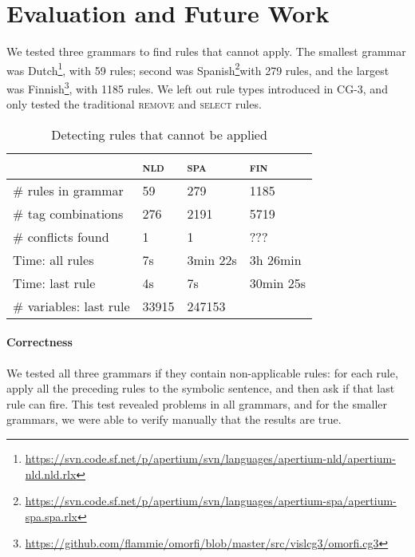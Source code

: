 \section{Evaluation and Future Work}
\label{sec:eval}

We tested three grammars to find rules that cannot apply. The smallest grammar was Dutch\footnote{\url{https://svn.code.sf.net/p/apertium/svn/languages/apertium-nld/apertium-nld.nld.rlx}}, with 59 rules; second was Spanish\footnote{\url{https://svn.code.sf.net/p/apertium/svn/languages/apertium-spa/apertium-spa.spa.rlx}}with 279 rules, and the largest was Finnish\footnote{\url{https://github.com/flammie/omorfi/blob/master/src/vislcg3/omorfi.cg3}}, with 1185 rules. We left out rule types introduced in CG-3, and only tested the traditional \textsc{remove} and \textsc{select} rules.

\begin{table}[]
\centering
\begin{tabular}{|l|l|l|l|}
\hline
                      & \textsc{nld}  & \textsc{spa}  & \textsc{fin}  \\ \hline
\# rules in grammar      & 59              & 279      & 1185     \\ \hline
\# tag combinations      & 276             & 2191     & 5719    \\ \hline
\# conflicts found       & 1               & 1        & ???    \\ \hline
Time: all rules       & 7s              & 3min 22s    & 3h 26min    \\ \hline
Time: last rule       & 4s              & 7s          & 30min 25s    \\ \hline

\# variables: last rule & 33915         & 247153            &    \\ \hline

\end{tabular}
\caption{Detecting rules that cannot be applied}
\label{table:res}
\end{table}

\paragraph{Correctness} We tested all three grammars if they contain non-applicable rules:
for each rule, apply all the preceding rules to the symbolic sentence, and then ask if that last rule can fire.
This test revealed problems in all grammars, and for the smaller grammars, we were able to verify manually that the results are true.

